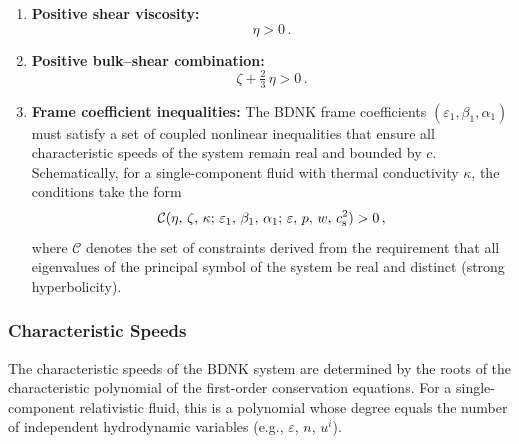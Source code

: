 \begin{enumerate}
  \item \textbf{Positive shear viscosity:}
  \begin{equation}
    \eta > 0\,.
    \label{eq:BDNK-eta-cond}
  \end{equation}

  \item \textbf{Positive bulk--shear combination:}
  \begin{equation}
    \zeta + \tfrac{2}{3}\,\eta > 0\,.
    \label{eq:BDNK-bulk-shear-cond}
  \end{equation}

  \item \textbf{Frame coefficient inequalities:} The BDNK frame
  coefficients $(\varepsilon_{1}, \beta_{1}, \alpha_{1})$ must
  satisfy a set of coupled nonlinear inequalities that ensure all
  characteristic speeds of the system remain real and bounded by $c$.
  Schematically, for a single-component fluid with thermal
  conductivity $\kappa$, the conditions take the form
  \begin{equation}
    \mathcal{C}(\eta,\,\zeta,\,\kappa;\,\varepsilon_{1},\,\beta_{1},\,\alpha_{1};\,\varepsilon,\,p,\,w,\,c_{\mathrm{s}}^{2}) > 0\,,
    \label{eq:BDNK-coupled-ineq}
  \end{equation}
  where $\mathcal{C}$ denotes the set of constraints derived from the
  requirement that all eigenvalues of the principal symbol of the
  system be real and distinct (strong hyperbolicity).
\end{enumerate}

\subsubsection{Characteristic Speeds}
\label{subsubsec:BDNK-char-speeds}
The characteristic speeds of the BDNK system are determined by the
roots of the characteristic polynomial of the first-order
conservation equations.  For a single-component relativistic fluid,
this is a polynomial whose degree equals the number of independent
hydrodynamic variables (e.g., $\varepsilon$, $n$, $u^{i}$).

